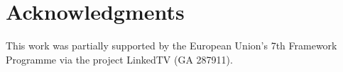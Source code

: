 \documentclass{llncs}
\begin{document}


\section*{Acknowledgments}
This work was partially supported by the European Union's 7th Framework Programme via the project LinkedTV (GA 287911).



\end{document}
